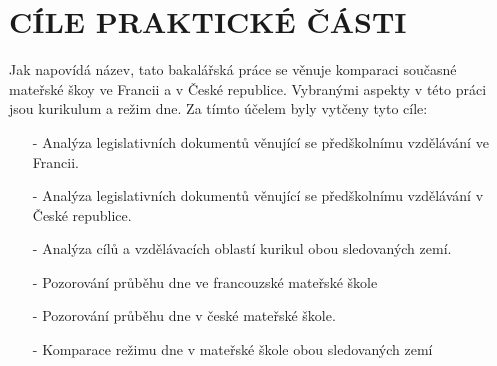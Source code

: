 \chapter{CÍLE PRAKTICKÉ ČÁSTI}
Jak napovídá název, tato bakalářská práce se věnuje komparaci současné mateřské škoy ve Francii a v České republice. Vybranými aspekty v této práci jsou kurikulum a režim dne. Za tímto účelem byly vytčeny tyto cíle:

\begin{itemize}
	\setlength\itemsep{-2mm}
	\item [-] Analýza legislativních dokumentů věnující se předškolnímu vzdělávání ve Francii.
	\item [-] Analýza legislativních dokumentů věnující se předškolnímu vzdělávání v České republice.
	\item [-] Analýza cílů a vzdělávacích oblastí kurikul obou sledovaných zemí.
	\item [-] Pozorování průběhu dne ve francouzské mateřské škole
	\item [-] Pozorování průběhu dne v české mateřské škole. 
	\item [-] Komparace režimu dne v mateřské škole obou sledovaných zemí
\end{itemize}


